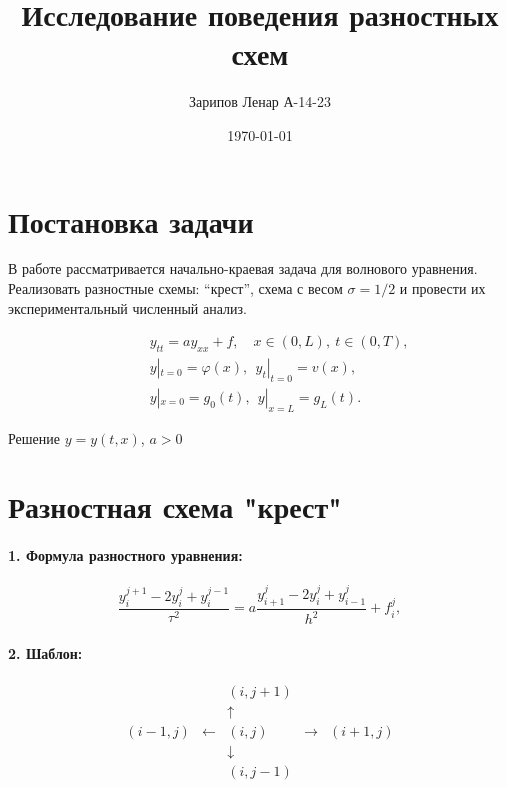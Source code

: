\documentclass[12pt,a4paper]{article}
\begin{document}
\large

\title{Исследование поведения разностных схем}
\author{Зарипов Ленар А-14-23}
\date{\today}
\maketitle

\section{Постановка задачи}

В работе рассматривается начально-краевая задача для волнового уравнения. Реализовать разностные схемы: ``крест'', схема с весом $\sigma = 1/2$ и провести их экспериментальный численный анализ.

\smallskip

\begin{align*}
\qquad
&y_{tt} = a y_{xx} + f, \quad x\in (0,L), \ t\in(0,T),
\\
&y|_{t=0} = \varphi(x), \ \ y_t|_{t=0} = v(x),
\\
&y|_{x = 0} = g_0(t), \ \ y|_{x = L} = g_L(t).
\end{align*}

\smallskip

Решение $y = y(t, x)$, $a > 0$

\section{Разностная схема "крест"}

\paragraph{1. Формула разностного уравнения:}

\[
\frac{y_i^{j+1} - 2y_i^j + y_i^{j-1}}{\tau^2} = a \frac{y_{i+1}^j - 2y_i^j + y_{i-1}^j}{h^2} + f_i^j,
\]

\paragraph{2. Шаблон:}

\[
\begin{array}{ccccc}
& & (i, j+1) & & \\
& & \uparrow & & \\
(i-1, j) & \leftarrow & (i, j) & \rightarrow & (i+1, j) \\
& & \downarrow & & \\
& & (i, j-1) & &
\end{array}
\]
\end{document}
